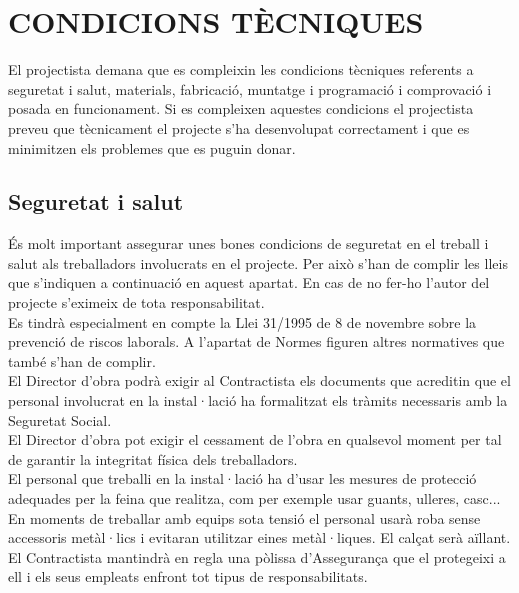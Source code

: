 \chapter{\uppercase{Condicions tècniques}}
El projectista demana que es compleixin les condicions tècniques referents a seguretat i salut, materials, fabricació, muntatge i programació i comprovació i posada en funcionament. Si es compleixen aquestes condicions el projectista preveu que tècnicament el projecte s'ha desenvolupat correctament i que es minimitzen els problemes que es puguin donar.

\section{Seguretat i salut}
És molt important assegurar unes bones condicions de seguretat en el treball i salut als treballadors involucrats en el projecte. Per això s'han de complir les lleis que s'indiquen a continuació en aquest apartat. En cas de no fer-ho l'autor del projecte s'eximeix de tota responsabilitat.\\
\newline Es tindrà especialment en compte la Llei 31/1995 de 8 de novembre sobre la prevenció de riscos laborals. A l'apartat de Normes figuren altres normatives que també s'han de complir.\\
\newline El Director d'obra podrà exigir al Contractista els documents que acreditin que el personal involucrat en la instal·lació ha formalitzat els tràmits necessaris amb la Seguretat Social.\\
\newline El Director d'obra pot exigir el cessament de l'obra en qualsevol moment per tal de garantir la integritat física dels treballadors.\\
\newline El personal que treballi en la instal·lació ha d'usar les mesures de protecció adequades per la feina que realitza, com per exemple usar guants, ulleres, casc... En moments de treballar amb equips sota tensió el personal usarà roba sense accessoris metàl·lics i evitaran utilitzar eines metàl·liques. El calçat serà aïllant.\\
\newline El Contractista mantindrà en regla una pòlissa d'Assegurança que el protegeixi a ell i els seus empleats enfront tot tipus de responsabilitats.

